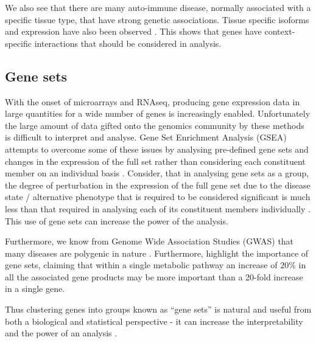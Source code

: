 \documentclass[12pt]{article} %
\begin{document}
	We also see that there are many auto-immune disease, normally associated with a specific tissue type, that have strong genetic associations. Tissue specific isoforms and expression have also been observed \cite{WangAlternativeisoformregulation2008a}. This shows that genes have context-specific interactions that should be considered in analysis.
	
	\subsection{Gene sets}
	With the onset of microarrays and RNAseq, producing gene expression data in large quantities for a wide number of genes is increasingly enabled. Unfortunately the large amount of data gifted onto the genomics community by these methods is difficult to interpret and analyse. Gene Set Enrichment Analysis (GSEA) attempts to overcome some of these issues by analysing pre-defined gene sets and changes in the expression of the full set rather than considering each constituent member on an individual basis \cite{MooneyGenesetanalysis2015}. Consider, that in analysing gene sets as a group, the degree of perturbation in the expression of the full gene set due to the disease state / alternative phenotype that is required to be considered significant is much less than that required in analysing each of its constituent members individually \cite{DudbridgePowerPredictiveAccuracy2013}\cite{WrayResearchReviewPolygenic2014}. This use of gene sets can increase the power of the analysis.
	
	Furthermore, we know from Genome Wide Association Studies (GWAS) that many diseases are polygenic in nature \cite{MooneyGenesetanalysis2015}. Furthermore, \citet{SubramanianGenesetenrichment2005a} highlight the importance of gene sets, claiming that within a single metabolic pathway an increase of $20\%$ in all the associated gene products may be more important than a 20-fold increase in a single gene.
	
	Thus clustering genes into groups known as ``gene sets'' is natural and useful from both a biological and statistical perspective - it can increase the interpretability and the power of an analysis \cite{NicaExpressionquantitativetrait2013}\cite{VosaUnravelingpolygenicarchitecture2018}.
	
\end{document}
